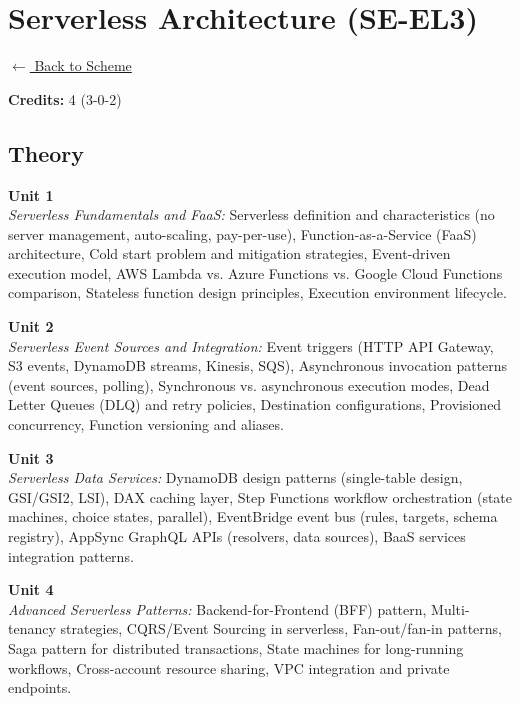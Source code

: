 \section*{Serverless Architecture (SE-EL3)}
\label{elec:SE_3}

\noindent \small{\hyperref[main:scheme]{$\leftarrow$ Back to Scheme}} \vspace{0.5cm}

\noindent \textbf{Credits:} 4 (3-0-2)

\subsection*{Theory}
\noindent\textbf{Unit 1} \\
\textit{Serverless Fundamentals and FaaS:} Serverless definition and characteristics (no server management, auto-scaling, pay-per-use), Function-as-a-Service (FaaS) architecture, Cold start problem and mitigation strategies, Event-driven execution model, AWS Lambda vs. Azure Functions vs. Google Cloud Functions comparison, Stateless function design principles, Execution environment lifecycle.

\vspace{0.3cm}

\noindent\textbf{Unit 2} \\
\textit{Serverless Event Sources and Integration:} Event triggers (HTTP API Gateway, S3 events, DynamoDB streams, Kinesis, SQS), Asynchronous invocation patterns (event sources, polling), Synchronous vs. asynchronous execution modes, Dead Letter Queues (DLQ) and retry policies, Destination configurations, Provisioned concurrency, Function versioning and aliases.

\vspace{0.3cm}

\noindent\textbf{Unit 3} \\
\textit{Serverless Data Services:} DynamoDB design patterns (single-table design, GSI/GSI2, LSI), DAX caching layer, Step Functions workflow orchestration (state machines, choice states, parallel), EventBridge event bus (rules, targets, schema registry), AppSync GraphQL APIs (resolvers, data sources), BaaS services integration patterns.

\vspace{0.3cm}

\noindent\textbf{Unit 4} \\
\textit{Advanced Serverless Patterns:} Backend-for-Frontend (BFF) pattern, Multi-tenancy strategies, CQRS/Event Sourcing in serverless, Fan-out/fan-in patterns, Saga pattern for distributed transactions, State machines for long-running workflows, Cross-account resource sharing, VPC integration and private endpoints.

